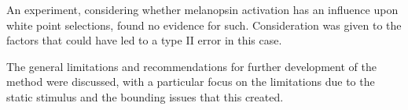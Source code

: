 An experiment, considering whether melanopsin activation has an influence upon white point selections, found no evidence for such. Consideration was given to the factors that could have led to a type II error in this case.

The general limitations and recommendations for further development of the method were discussed, with a particular focus on the limitations due to the static stimulus and the bounding issues that this created.




